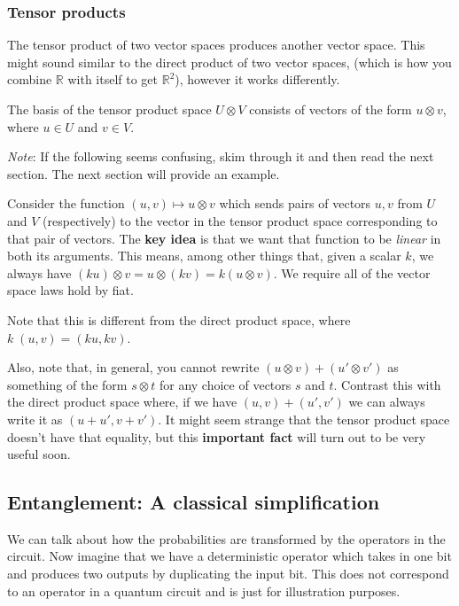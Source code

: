 \documentclass[runningheads]{llncs}
\begin{document}
\subsubsection{Tensor products}

The tensor product of two vector spaces produces another vector space. This might sound similar to the direct product of two vector spaces, (which is how you combine $\mathbb{R}$ with itself to get $\mathbb{R}^2$), however it works differently.

The basis of the tensor product space $U \otimes V$ consists of vectors of the form $u \otimes v$, where $u \in U$ and $v \in V$.

\textit{Note}: If the following seems confusing, skim through it and then read the next section. The next section will provide an example.

Consider the function $(u, v) \mapsto u \otimes v$ which sends pairs of vectors $u,v$ from $U$ and $V$ (respectively) to the vector in the tensor product space corresponding to that pair of vectors. The \textbf{key idea} is that we want that function to be \textit{linear} in both its arguments. This means, among other things that, given a scalar $k$, we always have $(k u) \otimes v = u \otimes (k v) = k (u \otimes v)$. We require all of the vector space laws hold by fiat.

Note that this is different from the direct product space, where $k\; (u, v) = (ku, kv)$.

Also, note that, in general, you cannot rewrite $(u \otimes v) + (u' \otimes v')$ as something of the form $s \otimes t$ for any choice of vectors $s$ and $t$. Contrast this with the direct product space where, if we have $(u, v) + (u', v')$ we can always write it as $(u + u', v + v')$. It might seem strange that the tensor product space doesn't have that equality, but this \textbf{important fact} will turn out to be very useful soon.

\subsection{Entanglement: A classical simplification}

We can talk about how the probabilities are transformed by the operators in the circuit. Now imagine that we have a
deterministic operator which takes in one bit and produces two outputs by duplicating the input bit. This does not correspond to an operator in a quantum circuit and is just for illustration purposes.
\\
\end{document}
